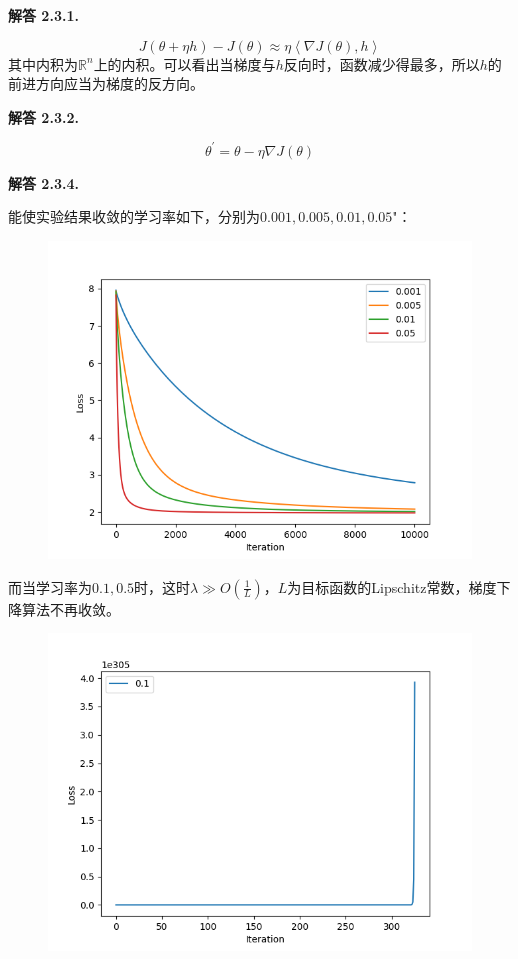 \documentclass[12pt, a4paper, oneside]{ctexart}
\newenvironment{solution}[1]{\par\noindent\textbf{解答 #1. }\par}{\par}
\begin{document}
\begin{solution}{2.3.1}
    \begin{equation}
        J(\theta + \eta h) - J(\theta) \approx \eta \left< \nabla J(\theta), h \right> \nonumber
    \end{equation}
    其中内积为$\mathbb{R}^n$上的内积。可以看出当梯度与$h$反向时，函数减少得最多，所以$h$的前进方向应当为梯度的反方向。
\end{solution}

\begin{solution}{2.3.2}
    \begin{equation}
        \theta^\prime = \theta - \eta \nabla J(\theta) \nonumber
    \end{equation}
\end{solution}

\begin{solution}{2.3.4}
    能使实验结果收敛的学习率如下，分别为$0.001, 0.005, 0.01, 0.05$"：
    \begin{figure}[htbp]
        \centering
        \includegraphics[width=.9\textwidth]{pic/Figure_2.png}
    \end{figure}
    而当学习率为$0.1, 0.5$时，这时$\lambda \gg O(\frac{1}{L})$，$L$为目标函数的Lipschitz常数，梯度下降算法不再收敛。
    \begin{figure}[htbp]
        \begin{minipage}[t]{0.5\linewidth}
        \centering
        \includegraphics[width=1.0\textwidth]{pic/Figure_3.png}

\end{minipage}
\end{figure}
\end{solution}
\end{document}
